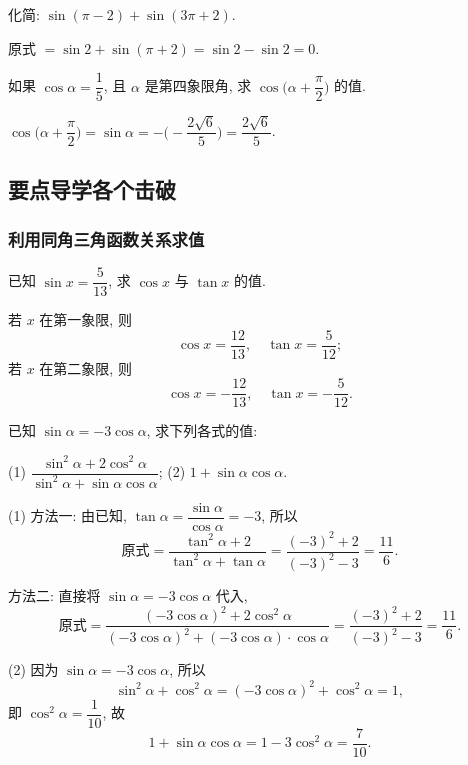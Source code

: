 \begin{exercise}
    化简: $\sin(\pi-2)+\sin(3\pi+2)$.
\end{exercise}
\beginsolution
    原式 $= \sin2+\sin(\pi+2)= \sin2- \sin2= 0$.
\endsolution

\begin{exercise}
    如果 $\cos\alpha =\dfrac15$, 且 $\alpha$ 是第四象限角,
    求 $\cos\biggl(\alpha+\dfrac{\pi}2\biggr)$ 的值.
\end{exercise}
\beginsolution
    $\cos\biggl(\alpha+\dfrac{\pi}2\biggr)= \sin\alpha
    = -\biggl(-\dfrac{2\sqrt6}5\biggr)
    = \dfrac{2\sqrt6}5$.
\endsolution

\subsection{要点导学\quad 各个击破}
\subsubsection{利用同角三角函数关系求值}
\begin{example}
    已知 $\sin x= \dfrac5{13}$, 求 $\cos x$ 与 $\tan x$ 的值.
\end{example}
\beginsolution
    若 $x$ 在第一象限, 则
    \[\cos x= \frac{12}{13},\quad
        \tan x= \frac{5}{12};\]
    若 $x$ 在第二象限, 则
    \[\cos x= -\frac{12}{13},\quad
        \tan x= -\frac{5}{12}.\]
\endsolution

\begin{example}
    已知 $\sin\alpha = -3\cos\alpha$, 求下列各式的值:
    
    (1) $\dfrac{\sin^2 \alpha+ 2\cos^2 \alpha}{ 
      \sin^2 \alpha+ \sin\alpha \cos\alpha}$;\qquad 
    (2) $1+\sin\alpha \cos\alpha$.
\end{example}
\beginsolution
    (1) 方法一: 由已知, $\tan\alpha= \dfrac{\sin\alpha}{\cos\alpha}= -3$, 所以
    \[\text{原式}= \frac{\tan^2 \alpha+ 2}{ 
        \tan^2 \alpha+ \tan\alpha}
        = \frac{(-3)^2+2}{(-3)^2-3}
        = \frac{11}{6}.\]
    
    方法二: 直接将 $\sin\alpha = -3\cos\alpha$ 代入,
    \[\text{原式}= \frac{(-3\cos\alpha)^2+ 2\cos^2\alpha}{ 
        (-3\cos\alpha)^2+ (-3\cos\alpha)\cdot\cos\alpha}
        = \frac{(-3)^2+2}{(-3)^2-3}
        = \frac{11}{6}.\]
    
    (2) 因为 $\sin\alpha = -3\cos\alpha$, 所以 
    \[\sin^2\alpha+ \cos^2\alpha= (-3\cos\alpha)^2+ \cos^2\alpha= 1,\]
    即 $\cos^2\alpha= \dfrac1{10}$, 故
    \[1+\sin\alpha \cos\alpha
        = 1- 3\cos^2\alpha= \frac{7}{10}.\]
\endsolution

